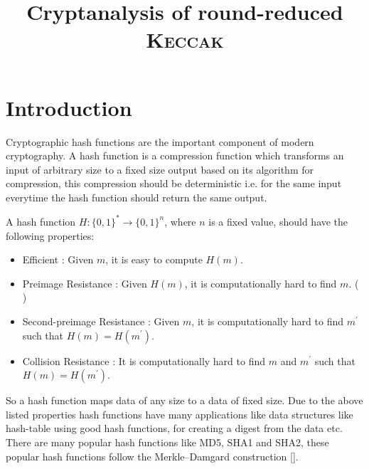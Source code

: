 \documentclass[runningheads]{llncs}
\newcommand{\KECCAK}{\mbox{\textsc{Keccak}}}
\newcommand{\SHA}{\textsc{Sha}}
\begin{document}
%
\title{Cryptanalysis of round-reduced \KECCAK}
%
%

\maketitle              %
%

%
%
%
\section{Introduction}

Cryptographic hash functions are the important component of  modern cryptography. A hash function is a compression function which transforms an input of arbitrary size to a fixed size output based on its algorithm for compression, this compression should be deterministic i.e. for the same input everytime the hash function should return the same output. 

A hash function $H:\{0,1\}^* \rightarrow \{0,1\}^n $, where $n$ is a fixed value, should have the following properties: 
\begin{itemize}\setlength\itemindent{20pt}
    \item Efficient : Given $m$, it is easy to compute $H(m)$.
        \item Preimage Resistance : Given $H(m)$, it is computationally hard to find $m$. (\textcolor{red}{ })
        \item Second-preimage Resistance : Given $m$, it is computationally hard to find $m^\prime$ such that $H(m)=H(m^\prime)$.
        \item Collision Resistance : It is computationally hard to find $m$ and $m^\prime$ such that $H(m)=H(m^\prime)$.
\end{itemize}

So a hash function maps data of any size to a data of fixed size. Due to the above listed properties hash functions have many applications like data structures like hash-table using good hash functions, for creating a digest from the data etc.
There are many popular hash functions like MD5, SHA1 and SHA2, these popular hash functions follow the Merkle–Damgard construction []. 
\end{document}
